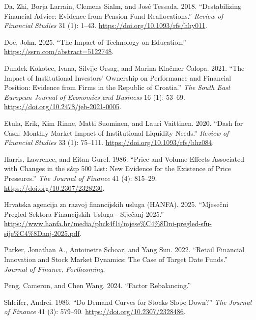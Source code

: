 \documentclass[
  letterpaper,
  DIV=11,
  numbers=noendperiod]{scrartcl}
\newlength{\cslhangindent}
\newenvironment{CSLReferences}[2] %
 {\begin{list}{}{%
  \setlength{\itemindent}{0pt}
  \setlength{\leftmargin}{0pt}
  \setlength{\parsep}{0pt}
  \ifodd #1
   \setlength{\leftmargin}{\cslhangindent}
   \setlength{\itemindent}{-1\cslhangindent}
  \fi
  \setlength{\itemsep}{#2\baselineskip}}}
 {\end{list}}
\begin{document}
\label{refs}
\begin{CSLReferences}{1}{0}
Da, Zhi, Borja Larrain, Clemens Sialm, and José Tessada. 2018.
{``Destabilizing Financial Advice: Evidence from Pension Fund
Reallocations.''} \emph{Review of Financial Studies} 31 (1): 1--43.
\url{https://doi.org/10.1093/rfs/hhy011}.

Doe, John. 2025. {``The Impact of Technology on Education.''}
\url{https://ssrn.com/abstract=5122748}.

Đunđek Kokotec, Ivana, Silvije Orsag, and Marina Klačmer Čalopa. 2021.
{``The Impact of Institutional Investors' Ownership on Performance and
Financial Position: Evidence from Firms in the Republic of Croatia.''}
\emph{The South East European Journal of Economics and Business} 16 (1):
53--69. \url{https://doi.org/10.2478/jeb-2021-0005}.

Etula, Erik, Kim Rinne, Matti Suominen, and Lauri Vaittinen. 2020.
{``Dash for Cash: Monthly Market Impact of Institutional Liquidity
Needs.''} \emph{Review of Financial Studies} 33 (1): 75--111.
\url{https://doi.org/10.1093/rfs/hhz084}.

Harris, Lawrence, and Eitan Gurel. 1986. {``Price and Volume Effects
Associated with Changes in the s\&p 500 List: New Evidence for the
Existence of Price Pressures.''} \emph{The Journal of Finance} 41 (4):
815--29. \url{https://doi.org/10.2307/2328230}.

Hrvatska agencija za razvoj financijskih usluga (HANFA). 2025.
{``Mjesečni Pregled Sektora Financijskih Usluga - Siječanj 2025.''}
\url{https://www.hanfa.hr/media/phck4f1i/mjese\%C4\%8Dni-pregled-sfu-sije\%C4\%8Danj-2025.pdf}.

Parker, Jonathan A., Antoinette Schoar, and Yang Sun. 2022. {``Retail
Financial Innovation and Stock Market Dynamics: The Case of Target Date
Funds.''} \emph{Journal of Finance, Forthcoming}.

Peng, Cameron, and Chen Wang. 2024. {``Factor Rebalancing.''}

Shleifer, Andrei. 1986. {``Do Demand Curves for Stocks Slope Down?''}
\emph{The Journal of Finance} 41 (3): 579--90.
\url{https://doi.org/10.2307/2328486}.

\end{CSLReferences}
\end{document}
